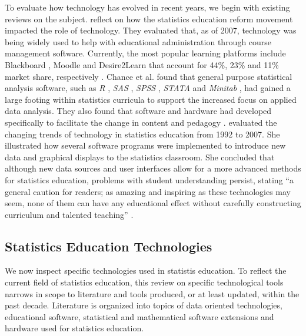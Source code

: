To evaluate how technology has evolved in recent years, we begin with existing reviews on the subject. \citet{chance2007} reflect on how the statistics education reform movement impacted the role of technology. They evaluated that, as of 2007, technology was being widely used to help with educational administration through course management software. Currently, the most popular learning platforms include Blackboard \citep{Blackboard}, Moodle \citep{Moodle} and Desire2Learn  that account for 44\%, 23\% and 11\% market share, respectively \citep{CampusComputing}. Chance et al. found that general purpose statistical analysis software, such as \textit{R} \citep{R}, \textit{SAS} \citep{SAS}, \textit{SPSS} \citep{SPSS}, \textit{STATA} \citep{STATA} and \textit{Minitab} \citep{Minitab}, had gained a large footing within statistics curricula to support the increased focus on applied data analysis. They also found that software and hardware had developed specifically to facilitate the change in content and pedagogy \citep{chance2007}. \citet{Rubin2007} evaluated the changing trends of technology in statistics education from 1992 to 2007. She illustrated how several software programs were implemented to introduce new data and graphical displays to the statistics classroom. She concluded that although new data sources and user interfaces allow for a more advanced methods for statistics education, problems with student understanding persist, stating ``a general caution for readers; as amazing and inspiring as these technologies may seem, none of them can have any educational effect without carefully constructing curriculum and talented teaching'' \citep[p.2]{Rubin2007}. 

\subsection{Statistics Education Technologies} 

We now inspect specific technologies used in statistis education.  To reflect the current field of statistics education, this review on specific technological tools narrows in scope to literature and tools produced, or at least updated, within the past decade. %
Literature is organized into topics of data oriented technologies, educational software, statistical and mathematical software extensions and hardware used for statistics education.

